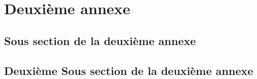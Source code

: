 \section{Deuxième annexe}
\subsection{Sous section de la deuxième annexe}
\subsection{Deuxième Sous section de la deuxième annexe}